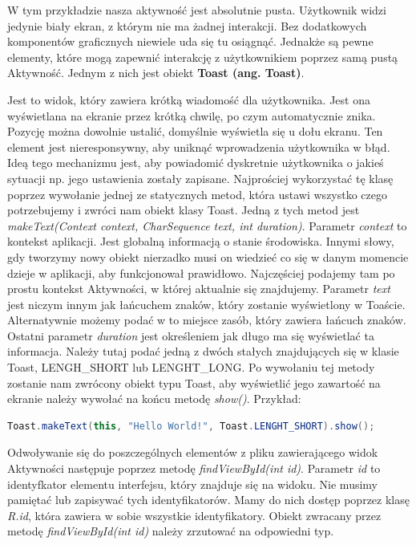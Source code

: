 \documentclass{article}
\numberwithin{equation}{section}
\begin{document}
W tym przykładzie nasza aktywność jest absolutnie pusta. Użytkownik widzi jedynie biały ekran, z którym nie ma żadnej interakcji. Bez dodatkowych komponentów graficznych niewiele uda się tu osiągnąć. Jednakże są pewne elementy, które mogą zapewnić interakcję z użytkownikiem poprzez samą pustą Aktywność. Jednym z nich jest obiekt \textbf{Toast (ang. Toast)}.\par Jest to widok, który zawiera krótką wiadomość dla użytkownika. Jest ona wyświetlana na ekranie przez krótką chwilę, po czym automatycznie znika. Pozycję można dowolnie ustalić, domyślnie wyświetla się u dołu ekranu. Ten element jest nieresponsywny, aby uniknąć wprowadzenia użytkownika w błąd. Ideą tego mechanizmu jest, aby powiadomić dyskretnie użytkownika o jakieś sytuacji np. jego ustawienia zostały zapisane. Najprościej wykorzystać tę klasę poprzez wywołanie jednej ze statycznych metod, która ustawi wszystko czego potrzebujemy i zwróci nam obiekt klasy Toast. Jedną z tych metod jest \textit{makeText(Context context, CharSequence text, int duration)}. Parametr \textit{context} to kontekst aplikacji. Jest globalną informacją o stanie środowiska. Innymi słowy, gdy tworzymy nowy obiekt nierzadko musi on wiedzieć co się w danym momencie dzieje w aplikacji, aby funkcjonował prawidłowo. Najczęściej podajemy tam po prostu kontekst Aktywności, w której aktualnie się znajdujemy. Parametr \textit{text} jest niczym innym jak łańcuchem znaków, który zostanie wyświetlony w Toaście. Alternatywnie możemy podać w to miejsce zasób, który zawiera łańcuch znaków. Ostatni parametr \textit{duration} jest określeniem jak długo ma się wyświetlać ta informacja. Należy tutaj podać jedną z dwóch stałych znajdujących się w klasie Toast, LENGH\_SHORT lub LENGHT\_LONG. Po wywołaniu tej metody zostanie nam zwrócony obiekt typu Toast, aby wyświetlić jego zawartość na ekranie należy wywołać na końcu metodę \textit{show()}.\citep{toast} Przykład:
\begin{lstlisting}[language=Java]
Toast.makeText(this, "Hello World!", Toast.LENGHT_SHORT).show();
\end{lstlisting}\par
Odwoływanie się do poszczególnych elementów z pliku zawierającego widok Aktywności następuje poprzez metodę \textit{findViewById(int id)}. Parametr \textit{id} to identyfkator elementu interfejsu, który znajduje się na widoku. Nie musimy pamiętać lub zapisywać tych identyfikatorów. Mamy do nich dostęp poprzez klasę \textit{R.id}, która zawiera w sobie wszystkie identyfikatory. Obiekt zwracany przez metodę \textit{findViewById(int id)} należy zrzutować na odpowiedni typ. 
\end{document}
